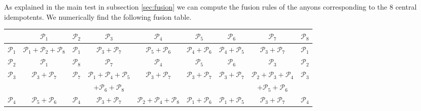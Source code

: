 \documentclass[12 pt]{article}
\begin{document}
As explained in the main test in subsection \ref{sec:fusion} we can compute the fusion rules of the anyons corresponding to the 8 central idempotents.
We numerically find the following fusion table.
\footnotesize
\begin{center}
    \begin{tabular}{ c || c | c | c | c | c | c | c | c |}
                        & $\mathcal{P}_1$                             & $\mathcal{P}_2$ & $\mathcal{P}_3$                             & $\mathcal{P}_4$                             & $\mathcal{P}_5$                             & $\mathcal{P}_6$                             & $\mathcal{P}_7$                             & $\mathcal{P}_8$ \\ \hline \hline
        $\mathcal{P}_1$ & $\mathcal{P}_1+\mathcal{P}_2+\mathcal{P}_8$ & $\mathcal{P}_1$ & $\mathcal{P}_3+\mathcal{P}_7$               & $\mathcal{P}_5+\mathcal{P}_6$               & $\mathcal{P}_4+\mathcal{P}_6$               & $\mathcal{P}_4+\mathcal{P}_5$               & $\mathcal{P}_3+\mathcal{P}_7$               & $\mathcal{P}_1$ \\ \hline
        $\mathcal{P}_2$ & $\mathcal{P}_1$                             & $\mathcal{P}_8$ & $\mathcal{P}_7$                             & $\mathcal{P}_4$                             & $\mathcal{P}_5$                             & $\mathcal{P}_6$                             & $\mathcal{P}_3$                             & $\mathcal{P}_2$ \\ \hline
        $\mathcal{P}_3$ & $\mathcal{P}_3+\mathcal{P}_7$               & $\mathcal{P}_7$ & $\mathcal{P}_1+\mathcal{P}_4+\mathcal{P}_5$ & $\mathcal{P}_3+\mathcal{P}_7$               & $\mathcal{P}_3+\mathcal{P}_7$               & $\mathcal{P}_3+\mathcal{P}_7$               & $\mathcal{P}_2+\mathcal{P}_3+\mathcal{P}_4$ & $\mathcal{P}_3$ \\
                        &                                             &                 & $+\mathcal{P}_6+\mathcal{P}_8$              &                                             &                                             &                                             & $+\mathcal{P}_5+\mathcal{P}_6$              &                 \\ \hline
        $\mathcal{P}_4$ & $\mathcal{P}_5+\mathcal{P}_6$               & $\mathcal{P}_4$ & $\mathcal{P}_3+\mathcal{P}_7$               & $\mathcal{P}_2+\mathcal{P}_4+\mathcal{P}_8$ & $\mathcal{P}_1+\mathcal{P}_6$               & $\mathcal{P}_1+\mathcal{P}_5$               & $\mathcal{P}_3+\mathcal{P}_7$               & $\mathcal{P}_4$ \\ \hline

\end{tabular}
\end{center}
\end{document}
